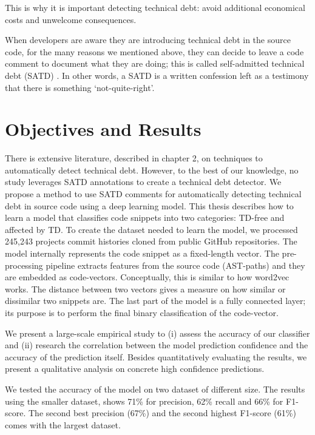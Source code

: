 This is why it is important detecting technical debt: avoid additional economical costs and unwelcome consequences. 

When developers are aware they are introducing technical debt in the source code, for the many reasons we mentioned above, they can decide to leave a code comment to document what they are doing; this is called self-admitted technical debt (SATD) \cite{potdar2014exploratory}. In other words, a SATD is a written confession left as a testimony that there is something `not-quite-right'.


\section{Objectives and Results}
There is extensive literature, described in chapter 2, on techniques to automatically detect technical debt. However, to the best of our knowledge, no study leverages SATD annotations to create a technical debt detector.
We propose a method to use SATD comments for automatically detecting technical debt in source code using a deep learning model. 
This thesis describes how to learn a model that classifies code snippets into two categories: TD-free and affected by TD.
To create the dataset needed to learn the model, we processed 245,243 projects commit histories cloned from public GitHub repositories. 
The model internally represents the code snippet as a fixed-length vector. The pre-processing pipeline extracts features from the source code (AST-paths) and they are embedded as code-vectors. Conceptually, this is similar to how word2vec works. The distance between two vectors gives a measure on how similar or dissimilar two snippets are. The last part of the model is a fully connected layer; its purpose is to perform the final binary classification of the code-vector. 

We present a large-scale empirical study to (i) assess the accuracy of our classifier and (ii) research the correlation between the model prediction confidence and the accuracy of the prediction itself. Besides quantitatively evaluating the results, we present a qualitative analysis on concrete high confidence predictions.

We tested the accuracy of the model on two dataset of different size. The results using the smaller dataset, shows 71\% for precision, 62\% recall and 66\% for F1-score. The second best precision (67\%) and the second highest F1-score (61\%) comes with the largest dataset.

